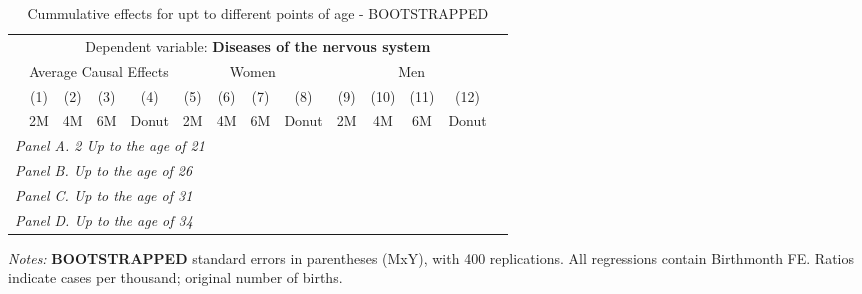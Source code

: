  \begin{table}[H] \begin{threeparttable} \centering \caption{Cummulative effects for upt to different points of age - BOOTSTRAPPED} {\def\sym#1{\ifmmode^{#1}\else\(^{#1}\)\fi} \begin{tabular}{l*{13}{c}} \toprule & \multicolumn{12}{c}{Dependent variable: \textbf{Diseases of the nervous system}} \\ \cmidrule(lr){2-13}
            &\multicolumn{4}{c}{Average Causal Effects}         &\multicolumn{4}{c}{Women}                          &\multicolumn{4}{c}{Men}                            \\\cmidrule(lr){2-5}\cmidrule(lr){6-9}\cmidrule(lr){10-13}
            &\multicolumn{1}{c}{(1)}&\multicolumn{1}{c}{(2)}&\multicolumn{1}{c}{(3)}&\multicolumn{1}{c}{(4)}&\multicolumn{1}{c}{(5)}&\multicolumn{1}{c}{(6)}&\multicolumn{1}{c}{(7)}&\multicolumn{1}{c}{(8)}&\multicolumn{1}{c}{(9)}&\multicolumn{1}{c}{(10)}&\multicolumn{1}{c}{(11)}&\multicolumn{1}{c}{(12)}\\
            &\multicolumn{1}{c}{2M}&\multicolumn{1}{c}{4M}&\multicolumn{1}{c}{6M}&\multicolumn{1}{c}{Donut}&\multicolumn{1}{c}{2M}&\multicolumn{1}{c}{4M}&\multicolumn{1}{c}{6M}&\multicolumn{1}{c}{Donut}&\multicolumn{1}{c}{2M}&\multicolumn{1}{c}{4M}&\multicolumn{1}{c}{6M}&\multicolumn{1}{c}{Donut}\\
\midrule
 \multicolumn{13}{l}{\emph{Panel A. 2 Up to the age of 21}} \\   \midrule\multicolumn{13}{l}{\emph{Panel B. Up to the age of 26}} \\   \midrule\multicolumn{13}{l}{\emph{Panel C. Up to the age of 31}} \\   \midrule\multicolumn{13}{l}{\emph{Panel D. Up to the age of 34}} \\   
\bottomrule \end{tabular} } \begin{tablenotes} \item \scriptsize \emph{Notes:} \textbf{BOOTSTRAPPED} standard errors in parentheses (MxY), with 400 replications. All regressions contain Birthmonth FE. Ratios indicate cases per thousand; original number of births. \end{tablenotes} \end{threeparttable} \end{table} 
